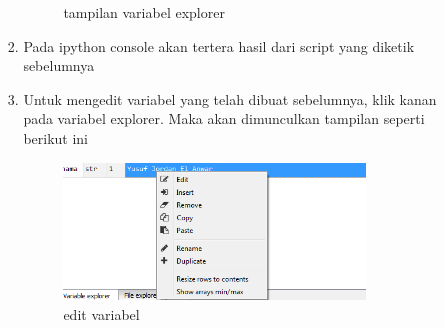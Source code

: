 \begin{enumerate}
\begin{itemize}
\begin{enumerate}
\begin{figure}[H]
			\centering
			\caption{tampilan variabel explorer}
			\end{figure}
		\item Pada ipython console akan tertera hasil dari script yang diketik sebelumnya
		\item Untuk mengedit variabel yang telah dibuat sebelumnya, klik kanan pada variabel explorer. Maka akan dimunculkan tampilan seperti berikut ini
			\begin{figure}[H]
			\includegraphics[width=8cm]{figures/1184026/variabel/3.png}
			\centering
			\caption{edit variabel}
			\end{figure}
		\end{enumerate}
\end{itemize}

\end{enumerate}
